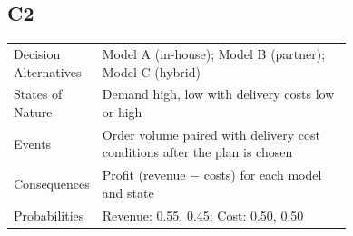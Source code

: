 \begin{ExamProblems}
		\subsection*{C2}
		\begin{center}
			\begin{tabular}{l p{0.74\linewidth}}
				\toprule
				Decision Alternatives & Model A (in-house); Model B (partner); Model C (hybrid) \\
				States of Nature & Demand high, low with delivery costs low or high \\
				Events & Order volume paired with delivery cost conditions after the plan is chosen \\
				Consequences & Profit (revenue $-$ costs) for each model and state \\
				Probabilities & Revenue: 0.55, 0.45; Cost: 0.50, 0.50 \\
				\bottomrule
			\end{tabular}
		\end{center}
		

\end{ExamProblems}
